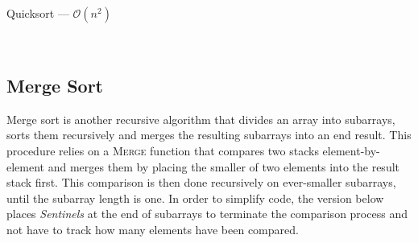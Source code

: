 \begin{algorithm}[H]
	\caption{Quicksort --- \( \mathcal{O}(n^2) \) }\label{alg:quick}
	\begin{algorithmic}
		\EndIf{}	
		\EndFunction{} \\
		 
		 
		 
		 
		  
		\EndIf{}
		\EndFor{}
		 
		\EndFunction{}
	\end{algorithmic}
\end{algorithm}

\subsection{Merge Sort}

Merge sort is another recursive algorithm that divides an array into subarrays, sorts them recursively and merges the resulting subarrays into an end result. This procedure relies on a \textsc{Merge} function that compares two stacks element-by-element and merges them by placing the smaller of two elements into the result stack first. This comparison is then done recursively on ever-smaller subarrays, until the subarray length is one. In order to simplify code, the version below places \emph{Sentinels} at the end of subarrays to terminate the comparison process and not have to track how many elements have been compared.


